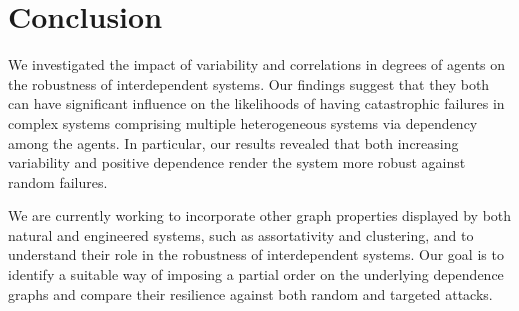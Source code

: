 \documentclass[10pt, journal, compsoc]{IEEEtran}
\begin{document}
\section{Conclusion}
	\label{sec:Conclusion}

We investigated the impact of variability and 
correlations in degrees of agents on the robustness
of interdependent systems. Our findings suggest
that they both can have significant influence
on the likelihoods of having catastrophic 
failures in complex systems comprising multiple
heterogeneous systems via dependency among
the agents. In particular, our results revealed
that both increasing variability and positive
dependence render the system more robust
against random failures. 

We are currently working to incorporate other
graph properties displayed by both 
natural and engineered systems, such as
assortativity and clustering, and to understand
their role in the robustness of interdependent
systems. Our goal is to identify a suitable
way of imposing a partial order on the 
underlying dependence graphs and compare their
resilience against both random and targeted
attacks. 
\end{document}
